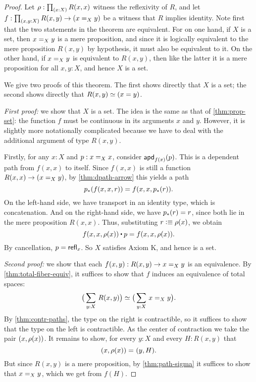 \begin{proof}
  Let $\rho : \prd{x:X} R(x,x)$ witness the reflexivity of $R$, and let $f : \prd{x,y:X} R(x,y) \to (\id[X]{x}{y})$ be a witness that $R$
implies identity.
  Note first that the two statements in the theorem are equivalent.
  For on one hand, if $X$ is a set, then $\id[X]xy$ is a mere proposition, and since it is logically equivalent to the mere proposition
$R(x,y)$ by hypothesis, it must also be equivalent to it.
  On the other hand, if $\id[X]xy$ is equivalent to $R(x,y)$, then like the latter it is a mere proposition for all $x,y:X$, and hence $X$
is a set.

  We give two proofs of this theorem.
  The first shows directly that $X$ is a set; the second shows directly that $R(x,y)\eqvsym (x=y)$.

  \emph{First proof:} we show that $X$ is a set.
  The idea is the same as that of \autoref{thm:prop-set}: the function $f$ must be continuous in its arguments $x$ and $y$.
  However, it is slightly more notationally complicated because we have to deal with the additional argument of type $R(x,y)$.

  Firstly, for any $x:X$ and $p:\id[X]xx$, consider $\apdfunc{f(x)}(p)$.
  This is a dependent path from $f(x,x)$ to itself.
  Since $f(x,x)$ is still a function $R(x,x) \to (\id[X]xy)$, by \autoref{thm:dpath-arrow} this yields a path
  \[\trans{p}{f(x,x,r)} = f(x,x,\trans{p}r).
  \]
  On the left-hand side, we have transport in an identity type, which is concatenation.
  And on the right-hand side, we have $\trans{p}r = r$, since both lie in the mere proposition $R(x,x)$.
  Thus, substituting $r\defeq \rho(x)$, we obtain
  \[ f(x,x,\rho(x)) \ct p = f(x,x,\rho(x)). \]
  By cancellation, $p=\refl{x}$.
  So $X$ satisfies Axiom K, and hence is a set.

  \emph{Second proof:} we show that each $f(x,y) : R(x,y) \to \id[X]{x}{y}$ is an equivalence.
  By \autoref{thm:total-fiber-equiv}, it suffices to show that $f$ induces an equivalence of total spaces:
  \begin{equation*}
    \eqv{\big(\sm{y:X}R(x,y)\big)}{\big(\sm{y:X}\id[X]{x}{y}\big)}.
  \end{equation*}
  By \autoref{thm:contr-paths}, the type on the right is contractible, so it
  suffices to show that the type on the left is contractible. As the center of
  contraction we take the pair $\pairr{x,\rho(x)}$.  It remains to show, for
  every ${y:X}$ and every ${H:R(x,y)}$ that
  \begin{equation*}
    \id{\pairr{x,\rho(x)}}{\pairr{y,H}}.
  \end{equation*}
  But since $R(x,y)$ is a mere proposition, by \autoref{thm:path-sigma} it suffices to show that
  $\id[X]{x}{y}$, which we get from $f(H)$.
\end{proof}

